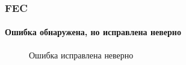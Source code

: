 \begin{frame}
    \frametitle{FEC}
    \framesubtitle{Ошибка обнаружена, но исправлена неверно}
    
    \begin{figure}
        \begin{center}
            \caption{Ошибка исправлена неверно}\label{pict:fecIncorrect}
        \end{center}
    \end{figure} 
\end{frame}


